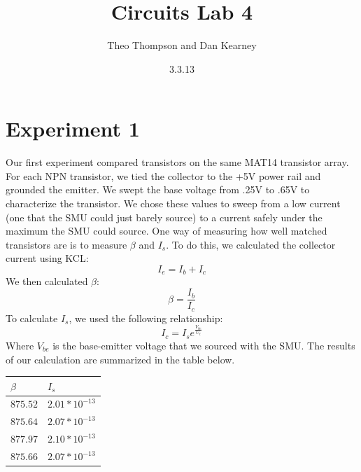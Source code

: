\documentclass{article}
\title{Circuits Lab 4}
\author{Theo Thompson and Dan Kearney}
\date{3.3.13}
\begin{document}
\maketitle

\section*{Experiment 1}

Our first experiment compared transistors on the same MAT14 transistor array. For each NPN transistor, we tied the collector to the +5V power rail and grounded the emitter. We swept the base voltage from .25V to .65V to characterize the transistor. We chose these values to sweep from a low current (one that the SMU could just barely source) to a current safely under the maximum the SMU could source. One way of measuring how well matched transistors are is to measure $\beta$ and $I_{s}$. To do this, we calculated the collector current using KCL: \[I_{e}=I_{b}+I_{c}\]
We then calculated $\beta$:\[\beta=\frac{I_{b}}{I_{c}}\]
To calculate $I_{s}$, we used the following relationship: \[I_{c}=I_{s}e^{\frac{V_{be}}{U_{t}}}\]
Where $V_{be}$ is the base-emitter voltage that we sourced with the SMU. The results of our calculation are summarized in the table below.
\begin{center}
    \begin{tabular}{| l | l |} \hline
    $\beta$ & $I_{s}$ \\ \hline \hline
    $875.52$ & $2.01*10^{-13}$ \\ \hline
    $875.64$ & $2.07*10^{-13}$\\ \hline
    $877.97$ & $2.10*10^{-13}$ \\ \hline
    $875.66$ & $2.07*10^{-13}$ \\ \hline
    \end{tabular}
\end{center}
\end{document}
